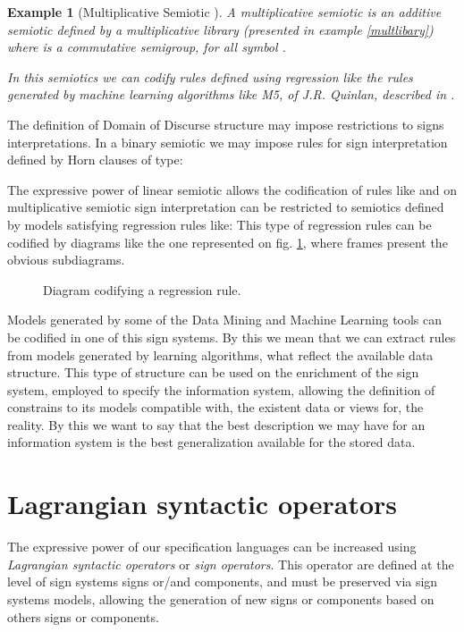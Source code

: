 \documentclass[oribibl]{llncs}
\newtheorem{exam}{Example}
\begin{document}
\begin{exam}[Multiplicative Semiotic ]
A \emph{multiplicative semiotic}  is an additive semiotic
 defined by a multiplicative library  (presented in example \ref{multlibary}) where
 is a commutative semigroup, for all symbol
.

In this semiotics we can codify rules defined using regression like the rules generated by machine learning algorithms like M5, of J.R. Quinlan, described in \cite{Quinlan93}.
\end{exam}

The definition of Domain of Discurse structure may impose restrictions to signs interpretations. In a binary semiotic we may impose rules for sign interpretation defined by Horn clauses of type:

The expressive power of linear semiotic allows the codification of rules like
 and on multiplicative semiotic sign interpretation can be restricted to semiotics defined by models satisfying regression rules like:
 This type of regression rules can be codified by
diagrams like the one represented on fig. \ref{regrassion}, where frames present the obvious
subdiagrams.
\begin{figure}[h]

\caption{Diagram codifying a regression rule.}\label{regrassion}
\end{figure}

Models generated by some of the Data Mining and Machine Learning tools can be codified in one of this sign systems. By this we mean that we can extract rules from models generated by learning algorithms, what reflect the available data structure. This type of structure can be used on the enrichment of the sign system, employed to specify the information system, allowing the definition of constrains to its models compatible with, the existent data or views for, the reality. By this we want to say that the best description we may have for an information system is the best generalization available for the stored data.

\section{Lagrangian syntactic operators}\label{synopt}
The expressive power of our specification languages can be increased using \emph{Lagrangian syntactic operators} or \emph{sign operators}. This operator are defined at the level of sign systems signs or/and components, and must be preserved via sign systems models, allowing the generation of new signs or components based on others signs or components.
\end{document}
